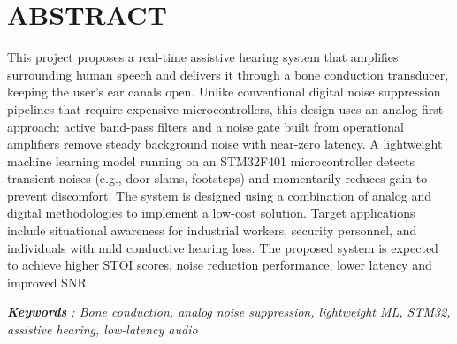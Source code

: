 \chapter*{ABSTRACT}

This project proposes a real-time assistive hearing system that amplifies surrounding human speech and delivers it through a bone conduction transducer, keeping the user's ear canals open. Unlike conventional digital noise suppression pipelines that require expensive microcontrollers, this design uses an analog-first approach: active band-pass filters and a noise gate built from operational amplifiers remove steady background noise with near-zero latency. A lightweight machine learning model running on an STM32F401 microcontroller detects transient noises (e.g., door slams, footsteps) and momentarily reduces gain to prevent discomfort. The system is designed using a combination of analog and digital methodologies to implement a low-cost solution. Target applications include situational awareness for industrial workers, security personnel, and individuals with mild conductive hearing loss. The proposed system is expected to achieve higher STOI scores, noise reduction performance, lower latency and improved SNR.

\textit{\textbf{Keywords} : Bone conduction, analog noise suppression, lightweight ML, STM32, assistive hearing, low-latency audio}